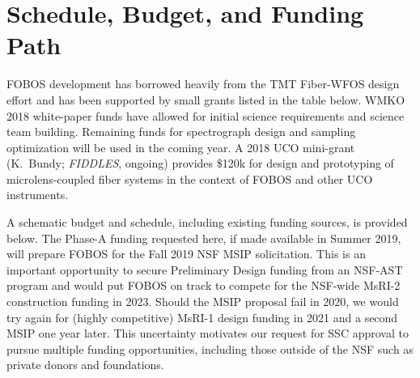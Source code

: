 
\section{Schedule, Budget, and Funding Path}
\label{sec:budget}

FOBOS development has borrowed heavily from the TMT Fiber-WFOS design effort and has been supported by small grants listed in the table below.  WMKO 2018 white-paper funds have allowed for initial science requirements and science team building.  Remaining funds for spectrograph design and sampling optimization will be used in the coming year.  A 2018 UCO
mini-grant (K.~Bundy; {\it FIDDLES}, ongoing) provides \$120k for design and prototyping of microlens-coupled fiber systems in the context of FOBOS and other UCO instruments. 






A schematic budget and schedule, including existing funding sources, is provided below.  The Phase-A funding requested here, if made available in Summer 2019, will prepare FOBOS for the Fall 2019 NSF MSIP solicitation.  This is an important opportunity to secure Preliminary Design funding from an NSF-AST program and would put FOBOS on track to compete for the NSF-wide MsRI-2 construction funding in 2023.  Should the MSIP proposal fail in 2020, we would try again for (highly competitive) MsRI-1 design funding in 2021 and a second MSIP one year later.  This uncertainty motivates our request for SSC approval to pursue multiple funding opportunities, including those outside of the NSF such as private donors and foundations.

